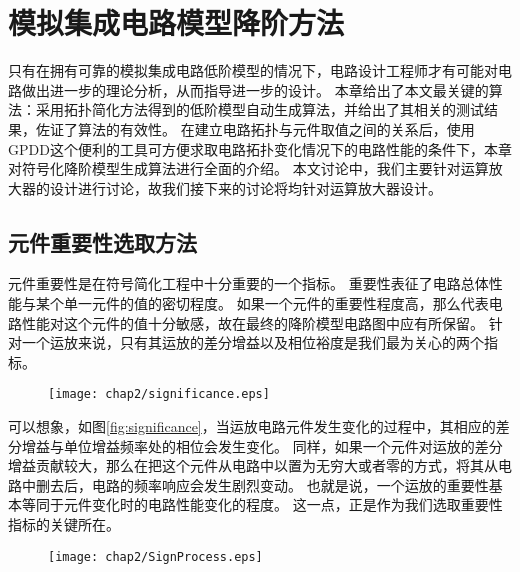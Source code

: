 
\chapter{模拟集成电路模型降阶方法}
\label{chap:MOR}

只有在拥有可靠的模拟集成电路低阶模型的情况下，电路设计工程师才有可能对电路做出进一步的理论分析，从而指导进一步的设计。
本章给出了本文最关键的算法：采用拓扑简化方法得到的低阶模型自动生成算法，并给出了其相关的测试结果，佐证了算法的有效性。
在建立电路拓扑与元件取值之间的关系后，使用GPDD这个便利的工具可方便求取电路拓扑变化情况下的电路性能的条件下，本章对符号化降阶模型生成算法进行全面的介绍。
本文讨论中，我们主要针对运算放大器的设计进行讨论，故我们接下来的讨论将均针对运算放大器设计。

\section{元件重要性选取方法}
\label{subsec:simp:alg:significance}

元件重要性是在符号简化工程中十分重要的一个指标。
重要性表征了电路总体性能与某个单一元件的值的密切程度。
如果一个元件的重要性程度高，那么代表电路性能对这个元件的值十分敏感，故在最终的降阶模型电路图中应有所保留。
针对一个运放来说，只有其运放的差分增益以及相位裕度是我们最为关心的两个指标。

\begin{figure}[!htp]
	\centering
	\texttt{[image: chap2/significance.eps]}
\end{figure}

可以想象，如图\ref{fig:significance}，当运放电路元件发生变化的过程中，其相应的差分增益与单位增益频率处的相位会发生变化。
同样，如果一个元件对运放的差分增益贡献较大，那么在把这个元件从电路中以置为无穷大或者零的方式，将其从电路中删去后，电路的频率响应会发生剧烈变动。
也就是说，一个运放的重要性基本等同于元件变化时的电路性能变化的程度。
这一点，正是作为我们选取重要性指标的关键所在。

\begin{figure}[!htp]
	\centering
	\texttt{[image: chap2/SignProcess.eps]}
\end{figure}

